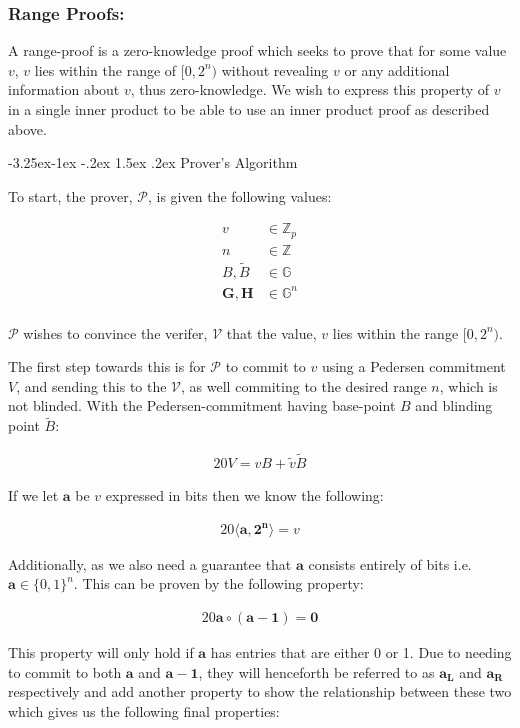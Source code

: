 \documentclass{article}
\makeatletter
\renewcommand\paragraph{\@startsection{paragraph}{4}{\z@}%
                                     {-3.25ex\@plus -1ex \@minus -.2ex}%
                                     {1.5ex \@plus .2ex}%
                                     {\normalfont\normalsize\bfseries}}
\newcommand{\eq}[1]{\begin{alignat*}{20}#1\end{alignat*}}
\newcommand{\eqn}[2]{\begin{equation}\label{#1}\begin{split}#2\end{split}\end{equation}}
\renewcommand{\vec}[1]{\boldsymbol{#1}}
\newcommand{\V}{\mathcal{V}}
\renewcommand{\P}{\mathcal{P}}
\newcommand{\G}{\mathbb{G}}
\newcommand{\Z}{\mathbb{Z}}
\newcommand{\tB}{\widetilde{B}}
\newcommand{\tv}{\widetilde{v}}
\newcommand{\dotp}[2]{\langle #1, #2 \rangle}
\newcommand{\opn}[1]{\operatorname{#1}}
\newcommand{\vecl}[1]{\vec{#1_{\opn{L}}}}
\newcommand{\vecr}[1]{\vec{#1_{\opn{R}}}}
\makeatother
\begin{document}
\subsubsection{Range Proofs:}\label{range-proofs}

A range-proof is a zero-knowledge proof which seeks to prove that for some value $v$, $v$ lies within the range of $[0,2^n)$ without revealing $v$ or any additional information about $v$, thus zero-knowledge. We wish to express this property of $v$ in a single inner product to be able to use an inner product proof as described above. 

\paragraph{Prover's Algorithm}\label{prover-range-proofs}

To start, the prover, $\P$, is given the following values:

\eqn{def1}{
	v &\in \Z_p \\
	n &\in \Z\\
	B, \tB &\in \G\\
	\vec{G}, \vec{H} &\in \G^n \\
}

$\P$ wishes to convince the verifer, $\V$ that the value, $v$ lies
within the range $[0,2^n)$.

The first step towards this is for $\P$ to commit to $v$ using
a Pedersen commitment $V$, and sending this to the $\V$, as well
commiting to the desired range $n$, which is not blinded. With the
Pedersen-commitment having base-point $B$ and blinding point $\tB$:

\eq{
	V = vB + \tv \tB
}

If we let $\vec{a}$ be $v$ expressed in bits then we know the following:

\eq{
	\dotp{\vec{a}}{\vec{2^n}} = v
}

Additionally, as we also need a guarantee that $\vec{a}$ consists
entirely of bits i.e. $\vec{a} \in \{0,1\}^n$. This can be
proven by the following property:

\eq{\vec{a}\circ (\vec{a} - \vec{1}) = \vec{0}}

This property will only hold if $\vec{a}$ has entries that are either
0 or 1. Due to needing to commit to both $\vec{a}$ and $\vec{a}
- \vec{1}$, they will henceforth be referred to as $\vecl{a}$
and $\vecr{a}$ respectively and add another property to show the
relationship between these two which gives us the following final
properties:
\end{document}
